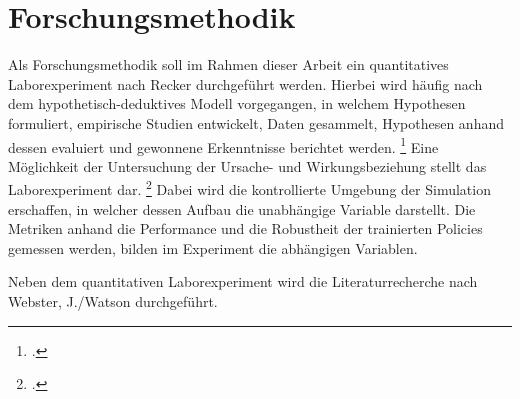 \section{Forschungsmethodik}

Als Forschungsmethodik soll im Rahmen dieser Arbeit ein quantitatives Laborexperiment nach Recker \cite*[]{Recker.2021} durchgeführt werden.
Hierbei wird häufig nach dem hypothetisch-deduktives Modell vorgegangen, in welchem Hypothesen formuliert, empirische Studien entwickelt, Daten gesammelt, Hypothesen anhand dessen evaluiert und gewonnene Erkenntnisse berichtet werden. \footcite[Vgl.][S. S.89f.]{Recker.2021}
Eine Möglichkeit der Untersuchung der Ursache- und Wirkungsbeziehung stellt das Laborexperiment dar. \footcite[Vgl.][S. 106]{Recker.2021}
Dabei wird die kontrollierte Umgebung der Simulation erschaffen, in welcher dessen Aufbau die unabhängige Variable darstellt.
Die Metriken anhand die Performance und die Robustheit der trainierten Policies gemessen werden, bilden im Experiment die abhängigen Variablen.

Neben dem quantitativen Laborexperiment wird die Literaturrecherche nach Webster, J./Watson \cite*[]{10.5555/2017160.2017162} durchgeführt.